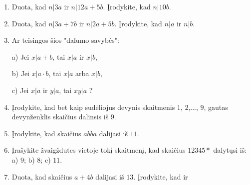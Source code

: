 \begin{enumerate} 
  \item Duota, kad $n|3a$ ir $n|12a+5b$. Įrodykite, kad $n|10b$.  
  \item Duota, kad $n|3a + 7b$ ir $n|2a+5b$.  Įrodykite, kad $n|a$ ir $n|b$.  
  \item Ar teisingos šios "dalumo savybės": 

    a) Jei $x|a + b$, tai $x|a$ ir $x|b$,

    b) Jei $x|a\cdot b$, tai $x|a$ arba $x|b$,

    c) Jei $x|a$ ir $y|a$, tai $xy|a$ ?
  \item Įrodykite, kad bet kaip sudėliojus devynis skaitmenis
    $1$, $2$,..., $9$, gautas devynženklis skaičius dalinsis iš $9$.  
  \item Įrodykite, kad skaičius $\overline{abba}$ dalijasi iš $11$.  
  \item Įrašykite žvaigždutes vietoje tokį skaitmenį, kad skaičius $12345*$
    dalytųsi iš: a) $9$; b) $8$; c) $11$.  
  \item Duota, kad skaičius $a+4b$ dalijasi iš $13$. Įrodykite, kad ir

\end{enumerate}
